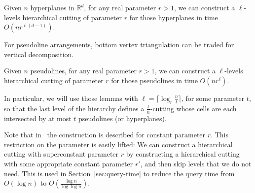 \ifjournal
\begin{lemma}\label{lem:hierarchical-cutting-d}
  Given \(n\) hyperplanes in \(\mathbb{R}^d\), for any real parameter \(r >
  1\), we can construct a \(\ell\)-levels hierarchical cutting of parameter
  \(r\) for those hyperplanes in time \(O(nr^{\ell(d-1)})\).
\end{lemma}

For pseudoline arrangements, bottom vertex triangulation can be traded for
vertical decomposition.
\begin{lemma}\label{lem:hierarchical-cutting-2}
  Given \(n\) pseudolines, for any real parameter \(r > 1\), we can construct
  a \(\ell\)-levels hierarchical cutting of parameter
  \(r\) for those pseudolines in time \(O(nr^\ell)\).
\end{lemma}

In particular, we will use those lemmas with
\(\ell = \lceil \log_r \frac nt \rceil\),
for some parameter \(t\),
so that the last level of the hierarchy defines a \(\frac
tn\)-cutting whose cells are each intersected by at most \(t\) pseudolines (or
hyperplanes).

Note that in~\cite{C93} the construction is described for constant
parameter \(r\).
This restriction on the parameter is easily lifted:
We can construct a hierarchical
cutting with superconstant parameter \(r\) by constructing a hierarchical
cutting with some appropriate constant parameter \(r'\), and then skip levels that we do
not need. This is used in Section~\ref{sec:query-time} to reduce the query time
from \(O(\log n)\) to \(O(\frac{\log n}{\log \log n})\).
\fi
